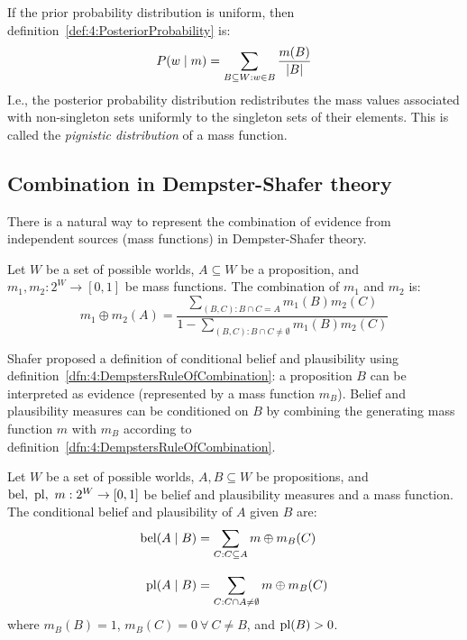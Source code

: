 If the prior probability distribution is uniform, then
definition~\ref{def:4:PosteriorProbability} is:
\begin{equation*}
  P(w \mid m) = \sum_{B \subseteq W : w \in B} \frac{m(B)}{|B|}
\end{equation*}
I.e., the posterior probability distribution redistributes the
mass values associated with non-singleton sets uniformly to the singleton sets
of their elements.
This is called the \textit{pignistic distribution} of a mass function.

\subsection{Combination in Dempster-Shafer theory}

There is a natural way to represent the combination of evidence from
independent sources (mass functions) in Dempster-Shafer theory.

\begin{dfn}
  \label{dfn:4:DempstersRuleOfCombination}
  Let $W$ be a set of possible worlds, $A \subseteq W$ be a proposition, and
  $m_1, m_2 : 2^W \to [0, 1]$ be mass functions.
  The combination of $m_1$ and $m_2$ is:
  \begin{equation}
    \label{eqn:4:DempstersRuleOfCombination}
    m_1 \oplus m_2 (A)
    = \frac{
      \sum_{(B, C) : B \cap C = A} m_1(B) m_2(C)
    }{
      1 - \sum_{(B, C) : B \cap C \neq \emptyset} m_1(B) m_2(C)
    }
  \end{equation}
\end{dfn}

Shafer proposed a definition of conditional belief and plausibility using
definition~\ref{dfn:4:DempstersRuleOfCombination}: a proposition $B$ can be
interpreted as evidence (represented by a mass function $m_B$).
Belief and plausibility measures can be conditioned on $B$ by combining the
generating mass function $m$ with $m_B$ according to
definition~\ref{dfn:4:DempstersRuleOfCombination}.

\begin{dfn}
  \label{dfn:4:ConditionalBeliefPlausibility}
  Let $W$ be a set of possible worlds, $A, B \subseteq W$ be propositions, and
  $\operatorname*{bel},\ \operatorname*{pl},\ m : 2^W \to [0, 1]$ be belief and plausibility measures and a
  mass function.
  The conditional belief and plausibility of $A$ given $B$ are:
  \begin{align}
    \label{eqn:4:ConditionalBelief}
    \operatorname*{bel}(A \mid B)
     & = \sum_{C : C \subseteq A} m \oplus m_B(C)
    \\[2ex]
    \label{eqn:4:ConditionalPlausibility}
    \operatorname*{pl}(A \mid B)
     & = \sum_{C : C \cap A \neq \emptyset} m \oplus m_B(C)
  \end{align}
  where $m_B(B) = 1$, $m_B(C) = 0\ \forall\ C \neq B$, and $\operatorname*{pl}(B) > 0$.
\end{dfn}

